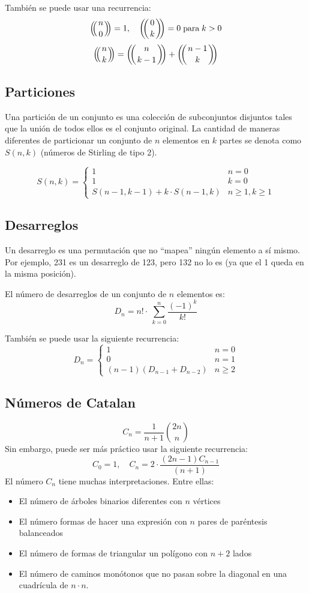 \documentclass{article}
\def\multiset#1#2{\ensuremath{\left(\kern-.3em\left(\genfrac{}{}{0pt}{}{#1}{#2}\right)\kern-.3em\right)}}
\begin{document}
\begin{multicols}{2}
También se puede usar una recurrencia:
\[ 
	\multiset{n}{0} = 1, \quad \multiset{0}{k} = 0 \; \textrm{para} \; k > 0 
\]
\[ 
	\multiset{n}{k} = \multiset{n}{k-1} + \multiset{n-1}{k} 
\]

\subsection{Particiones}
Una partición de un conjunto es una colección de subconjuntos disjuntos tales que la unión de todos ellos es el conjunto original. La cantidad de maneras diferentes de particionar un conjunto de \( n \) elementos en \( k \) partes se denota como \( S(n, k) \) (números de Stirling de tipo 2).

	\[
		S(n,k) = \left \{ 
			\begin{array}{lcc}
				1 & n = 0
				\\ 1 & k = 0
				\\ S(n-1, k-1) + k \cdot S(n-1, k) & n \geq 1, k \geq 1
			\end{array}
		\right.
	\]

\subsection{Desarreglos}
Un desarreglo es una permutación que no ``mapea'' ningún elemento a sí mismo. Por ejemplo, 231 es un desarreglo de 123, pero 132 no lo es (ya que el 1 queda en la misma posición).

El número de desarreglos de un conjunto de \( n \) elementos es:
\[
	D_{n} = n! \cdot \ \sum_{k=0}^{n} \frac{(-1)^k}{k!}
\]

También se puede usar la siguiente recurrencia:
	\[
		D_{n} = \left \{ 
			\begin{array}{lcc}
				1 & n = 0
				\\ 0 & n = 1
				\\ (n-1)(D_{n-1} + D_{n-2}) & n \geq 2 
			\end{array}
		\right.
	\]

\subsection{Números de Catalan}
\[
	C_{n} = \frac{1}{n+1} \binom{2n}{n}
\]
Sin embargo, puede ser más práctico usar la siguiente recurrencia:
\[
	C_0 = 1, \quad C_{n} = 2 \cdot \frac{(2n-1)C_{n-1}}{(n+1)}
\]
El número \( C_{n} \) tiene muchas interpretaciones. Entre ellas:
\begin{itemize}
	\item El número de árboles binarios diferentes con \( n \) vértices
	\item El número formas de hacer una expresión con \( n \) pares de paréntesis balanceados
	\item El número de formas de triangular un polígono con \( n+2 \) lados
	\item El número de caminos monótonos que no pasan sobre la diagonal en una cuadrícula de \( n \cdot n \).
\end{itemize}
		

\end{multicols}
\end{document}
